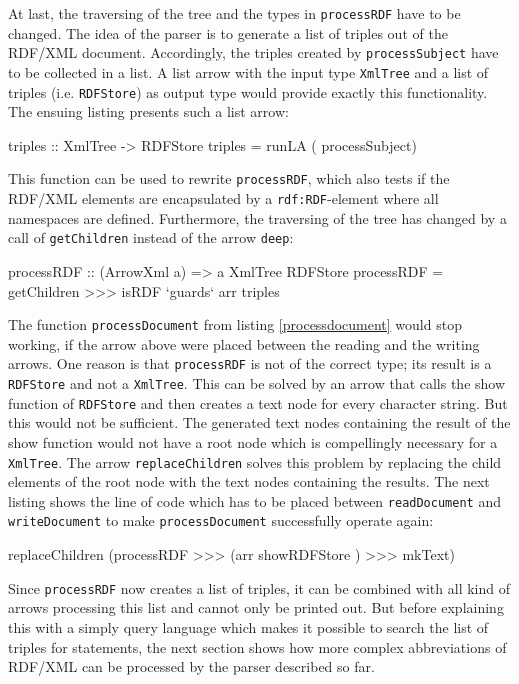 \documentclass[11pt,a4paper,headsepline, bibtotoc]{scrreprt}
\begin{document}
At last, the traversing of the tree and the types in \texttt{processRDF} have to be changed. The idea of the parser is to generate a list of triples out of the RDF/XML document. Accordingly, the triples created by \texttt{processSubject} have to be collected in a list. A list arrow with the input type \texttt{XmlTree} and a list of triples (i.e. \texttt{RDFStore}) as output type would provide exactly this functionality. The ensuing listing presents such a list arrow:
\begin{code}[caption=Collect Triples]
triples :: XmlTree -> RDFStore 
triples = runLA  ( processSubject)
\end{code}
This function can be used to rewrite \texttt{processRDF}, which also tests if the RDF/XML elements are encapsulated by a \texttt{rdf:RDF}-element where all namespaces are defined. Furthermore, the traversing of the tree has changed by a call of \texttt{getChildren} instead of the arrow \texttt{deep}:
\begin{code}
processRDF :: (ArrowXml a) => a XmlTree RDFStore
processRDF = getChildren >>> isRDF `guards` arr triples
\end{code}
The function \texttt{processDocument} from listing \ref{processdocument} would stop working, if the arrow above were placed between the reading and the writing arrows. One reason is that \texttt{processRDF} is not of the correct type; its result is a \texttt{RDFStore} and not a \texttt{XmlTree}. This can be solved by an arrow that calls the show function of \texttt{RDFStore} and then creates a text node for every character string. But this would not be sufficient. The generated text nodes containing the result of the show function would not have a root node which is compellingly necessary for a \texttt{XmlTree}. The arrow \texttt{replaceChildren} solves this problem by replacing the child elements of the root node with the text nodes containing the results. The next listing shows the line of code which has to be placed between \texttt{readDocument} and \texttt{writeDocument} to make \texttt{processDocument} successfully operate again:
\begin{code}
replaceChildren (processRDF >>> (arr showRDFStore ) >>> mkText)
\end{code}
Since \texttt{processRDF} now creates a list of triples, it can be combined with all kind of arrows processing this list and cannot only be printed out. But before explaining this with a simply query language which makes it possible to search the list of triples for statements, the next section shows how more complex abbreviations of RDF/XML can be processed by the parser described so far. 
\end{document}
